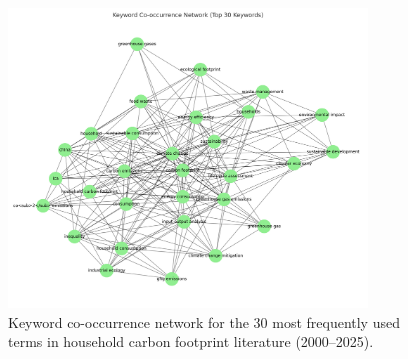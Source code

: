 \documentclass[12pt,a4paper]{article}%
\begin{document}
\begin{figure}[htbp]
    \centering
    \includegraphics[width=0.85\textwidth]{keyword_cooccurrence.png}
    \caption{Keyword co-occurrence network for the 30 most frequently used terms in household carbon footprint literature (2000–2025).}
\end{figure}
\end{document}
